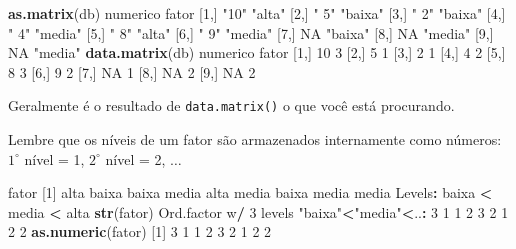 \documentclass[10pt,a4paper]{book}
\newenvironment{Shaded}{\begin{snugshade}}{\end{snugshade}}
\newcommand{\KeywordTok}[1]{\textcolor[rgb]{0.13,0.29,0.53}{\textbf{#1}}}
\newcommand{\DecValTok}[1]{\textcolor[rgb]{0.00,0.00,0.81}{#1}}
\newcommand{\StringTok}[1]{\textcolor[rgb]{0.31,0.60,0.02}{#1}}
\newcommand{\OtherTok}[1]{\textcolor[rgb]{0.56,0.35,0.01}{#1}}
\newcommand{\OperatorTok}[1]{\textcolor[rgb]{0.81,0.36,0.00}{\textbf{#1}}}
\newcommand{\NormalTok}[1]{#1}
\begin{document}
\begin{Shaded}
\begin{Highlighting}[]
\KeywordTok{as.matrix}\NormalTok{(db)}
\NormalTok{      numerico fator  }
\NormalTok{ [}\DecValTok{1}\NormalTok{,] }\StringTok{"10"}     \StringTok{"alta"} 
\NormalTok{ [}\DecValTok{2}\NormalTok{,] }\StringTok{" 5"}     \StringTok{"baixa"}
\NormalTok{ [}\DecValTok{3}\NormalTok{,] }\StringTok{" 2"}     \StringTok{"baixa"}
\NormalTok{ [}\DecValTok{4}\NormalTok{,] }\StringTok{" 4"}     \StringTok{"media"}
\NormalTok{ [}\DecValTok{5}\NormalTok{,] }\StringTok{" 8"}     \StringTok{"alta"} 
\NormalTok{ [}\DecValTok{6}\NormalTok{,] }\StringTok{" 9"}     \StringTok{"media"}
\NormalTok{ [}\DecValTok{7}\NormalTok{,] }\OtherTok{NA}       \StringTok{"baixa"}
\NormalTok{ [}\DecValTok{8}\NormalTok{,] }\OtherTok{NA}       \StringTok{"media"}
\NormalTok{ [}\DecValTok{9}\NormalTok{,] }\OtherTok{NA}       \StringTok{"media"}
\KeywordTok{data.matrix}\NormalTok{(db)}
\NormalTok{      numerico fator}
\NormalTok{ [}\DecValTok{1}\NormalTok{,]       }\DecValTok{10}     \DecValTok{3}
\NormalTok{ [}\DecValTok{2}\NormalTok{,]        }\DecValTok{5}     \DecValTok{1}
\NormalTok{ [}\DecValTok{3}\NormalTok{,]        }\DecValTok{2}     \DecValTok{1}
\NormalTok{ [}\DecValTok{4}\NormalTok{,]        }\DecValTok{4}     \DecValTok{2}
\NormalTok{ [}\DecValTok{5}\NormalTok{,]        }\DecValTok{8}     \DecValTok{3}
\NormalTok{ [}\DecValTok{6}\NormalTok{,]        }\DecValTok{9}     \DecValTok{2}
\NormalTok{ [}\DecValTok{7}\NormalTok{,]       }\OtherTok{NA}     \DecValTok{1}
\NormalTok{ [}\DecValTok{8}\NormalTok{,]       }\OtherTok{NA}     \DecValTok{2}
\NormalTok{ [}\DecValTok{9}\NormalTok{,]       }\OtherTok{NA}     \DecValTok{2}
\end{Highlighting}
\end{Shaded}

Geralmente é o resultado de \texttt{data.matrix()} o que você está
procurando.

Lembre que os níveis de um fator são armazenados internamente como
números: \(1^\circ\) nível = 1, \(2^\circ\) nível = 2, \(\ldots\)

\begin{Shaded}
\begin{Highlighting}[]
\NormalTok{fator}
\NormalTok{[}\DecValTok{1}\NormalTok{] alta  baixa baixa media alta  media baixa media media}
\NormalTok{Levels}\OperatorTok{:}\StringTok{ }\NormalTok{baixa }\OperatorTok{<}\StringTok{ }\NormalTok{media }\OperatorTok{<}\StringTok{ }\NormalTok{alta}
\KeywordTok{str}\NormalTok{(fator)}
\NormalTok{ Ord.factor w}\OperatorTok{/}\StringTok{ }\DecValTok{3}\NormalTok{ levels }\StringTok{"baixa"}\OperatorTok{<}\StringTok{"media"}\OperatorTok{<}\NormalTok{..}\OperatorTok{:}\StringTok{ }\DecValTok{3} \DecValTok{1} \DecValTok{1} \DecValTok{2} \DecValTok{3} \DecValTok{2} \DecValTok{1} \DecValTok{2} \DecValTok{2}
\KeywordTok{as.numeric}\NormalTok{(fator)}
\NormalTok{[}\DecValTok{1}\NormalTok{] }\DecValTok{3} \DecValTok{1} \DecValTok{1} \DecValTok{2} \DecValTok{3} \DecValTok{2} \DecValTok{1} \DecValTok{2} \DecValTok{2}
\end{Highlighting}
\end{Shaded}
\end{document}

